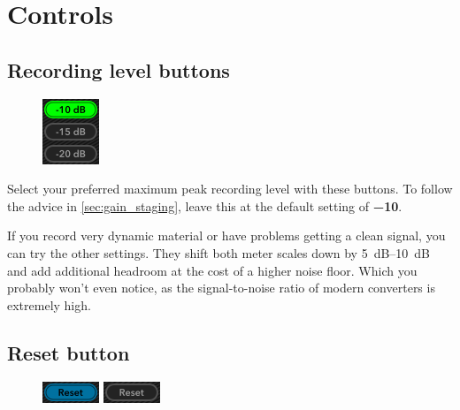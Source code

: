 \chapter{Controls}
\label{chap:controls}

\section{Recording level buttons}
\label{sec:recording_level_buttons}

\begin{figure}
  \includegraphics[scale=\screenshotscale,clip]{include/images/button_recording_level.png}
\end{figure}

Select your preferred maximum peak recording level with these buttons.
To follow the advice in \ref{sec:gain_staging}, leave this at the
default setting of \textbf{\SI{-10}{\dBFS}}.

If you record very dynamic material or have problems getting a clean
signal, you can try the other settings.  They shift both meter scales
down by \SIrange{5}{10}{\dB} and add additional headroom at the cost
of a higher noise floor.  Which you probably won't even notice, as the
signal-to-noise ratio of modern converters is extremely high.

\section{Reset button}
\label{sec:reset_button}

\begin{figure}
  \includegraphics[scale=\screenshotscale,clip]{include/images/button_reset_on.png}
  \newline \vspace{-0.9\baselineskip}
  \includegraphics[scale=\screenshotscale,clip]{include/images/button_reset_off.png}
\end{figure}

